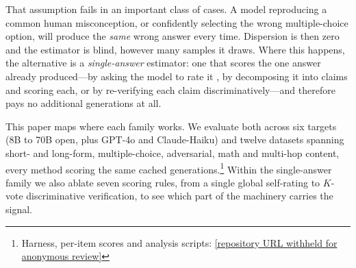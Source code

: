 \documentclass[11pt]{article}
\begin{document}
That assumption fails in an important class of cases. A model reproducing a common human
misconception, or confidently selecting the wrong multiple-choice option, will produce the
\emph{same} wrong answer every time. Dispersion is then zero and the estimator is blind, however
many samples it draws. Where this happens, the alternative is a \emph{single-answer} estimator:
one that scores the one answer already produced---by asking the model to rate it
\citep{tian2023just,kadavath2022language}, by decomposing it into claims and scoring each, or by
re-verifying each claim discriminatively---and therefore pays no additional generations at all.

This paper maps where each family works. We evaluate both across six targets (8B to 70B open,
plus GPT-4o and Claude-Haiku) and twelve datasets spanning short- and long-form, multiple-choice,
adversarial, math and multi-hop content, every method scoring the same cached generations.\footnote{Harness, per-item scores and analysis scripts:
\url{[repository URL withheld for anonymous review]}} Within the single-answer family we also
ablate seven scoring rules, from a single global self-rating to $K$-vote discriminative
verification, to see which part of the machinery carries the signal.
\end{document}
